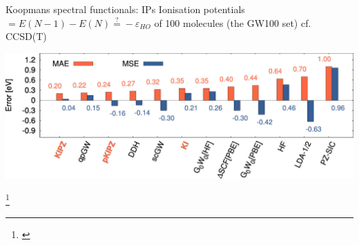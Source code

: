 \documentclass[xcolor=table,aspectratio=169]{beamer}
\newcommand\blfootcite[1]{%
  \begingroup
  \renewcommand\thefootnote{}\footnote{\hspace{-4ex}\cite{#1}}%
  \addtocounter{footnote}{-1}%
  \endgroup
}
\numberwithin{equation}{section}
\begin{document}
\begin{frame}{Koopmans spectral functionals: IPs}
   Ionisation potentials $ = E(N-1) - E(N) \stackrel{?}{=} -\varepsilon_{HO}$ of 100 molecules (the GW100 set) cf. CCSD(T)
   \begin{center}
      \includegraphics[height=0.23\textwidth]{figures/colonna_2019_gw100_ip}
   \end{center}

   \blfootcite{Colonna2018,vanSetten2015}
\end{frame}
\end{document}
